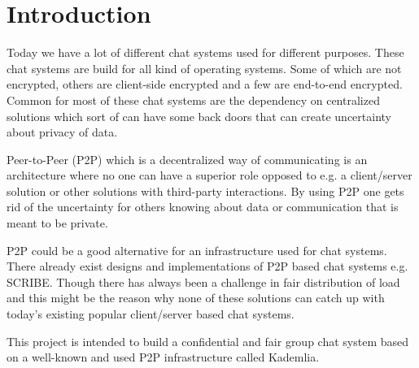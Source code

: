 \chapter{Introduction}\label{cha:introduction}
Today we have a lot of different chat systems used for different purposes. These chat systems are build for all kind of operating systems. 
Some of which are not encrypted, others are client-side encrypted and a few are end-to-end encrypted. Common for most of these chat systems are the dependency on centralized solutions which sort of can have some back doors that can create uncertainty about privacy of data. 

Peer-to-Peer (P2P) which is a decentralized way of communicating is an architecture where no one can have a superior role opposed to e.g. a client/server solution or other solutions with third-party interactions. By using P2P one gets rid of the uncertainty for others knowing about data or communication that is meant to be private. 

P2P could be a good alternative for an infrastructure used for chat systems. There already exist designs and implementations of P2P based chat systems e.g. SCRIBE. Though there has always been a challenge in fair distribution of load and this might be the reason why none of these solutions can catch up with today's existing popular client/server based chat systems.  

This project is intended to build a confidential and fair group chat system based on a well-known and used P2P infrastructure called Kademlia.

